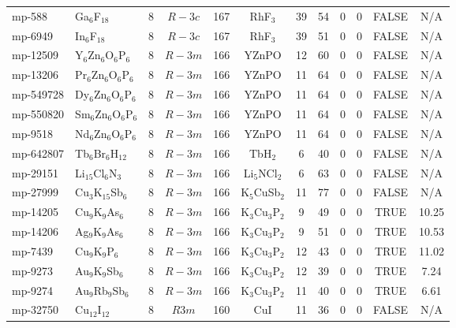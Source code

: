 {\begin{longtable}{llcccccccccc}
    mp-588 & Ga$_{6}$F$_{18}$ & 8     & $R-3c$ & 167   & RhF$_{3}$ & 39    & 54    & 0     & 0     & FALSE & N/A \\
    mp-6949 & In$_{6}$F$_{18}$ & 8     & $R-3c$ & 167   & RhF$_{3}$ & 39    & 51    & 0     & 0     & FALSE & N/A \\
    mp-12509 & Y$_{6}$Zn$_{6}$O$_{6}$P$_{6}$ & 8     & $R-3m$ & 166   & YZnPO & 12    & 60    & 0     & 0     & FALSE & N/A \\
    mp-13206 & Pr$_{6}$Zn$_{6}$O$_{6}$P$_{6}$ & 8     & $R-3m$ & 166   & YZnPO & 11    & 64    & 0     & 0     & FALSE & N/A \\
    mp-549728 & Dy$_{6}$Zn$_{6}$O$_{6}$P$_{6}$ & 8     & $R-3m$ & 166   & YZnPO & 11    & 64    & 0     & 0     & FALSE & N/A \\
    mp-550820 & Sm$_{6}$Zn$_{6}$O$_{6}$P$_{6}$ & 8     & $R-3m$ & 166   & YZnPO & 11    & 64    & 0     & 0     & FALSE & N/A \\
    mp-9518 & Nd$_{6}$Zn$_{6}$O$_{6}$P$_{6}$ & 8     & $R-3m$ & 166   & YZnPO & 11    & 64    & 0     & 0     & FALSE & N/A \\
    mp-642807 & Tb$_{6}$Br$_{6}$H$_{12}$ & 8     & $R-3m$ & 166   & TbH$_{2}$ & 6     & 40    & 0     & 0     & FALSE & N/A \\
    mp-29151 & Li$_{15}$Cl$_{6}$N$_{3}$ & 8     & $R-3m$ & 166   & Li$_{5}$NCl$_{2}$ & 6     & 63    & 0     & 0     & FALSE & N/A \\
    mp-27999 & Cu$_{3}$K$_{15}$Sb$_{6}$ & 8     & $R-3m$ & 166   & K$_{5}$CuSb$_{2}$ & 11    & 77    & 0     & 0     & FALSE & N/A \\
    mp-14205 & Cu$_{9}$K$_{9}$As$_{6}$ & 8     & $R-3m$ & 166   & K$_{3}$Cu$_{3}$P$_{2}$ & 9     & 49    & 0     & 0     & TRUE  & 10.25  \\
    mp-14206 & Ag$_{9}$K$_{9}$As$_{6}$ & 8     & $R-3m$ & 166   & K$_{3}$Cu$_{3}$P$_{2}$ & 9     & 51    & 0     & 0     & TRUE  & 10.53  \\
    mp-7439 & Cu$_{9}$K$_{9}$P$_{6}$ & 8     & $R-3m$ & 166   & K$_{3}$Cu$_{3}$P$_{2}$ & 12    & 43    & 0     & 0     & TRUE  & 11.02  \\
    mp-9273 & Au$_{9}$K$_{9}$Sb$_{6}$ & 8     & $R-3m$ & 166   & K$_{3}$Cu$_{3}$P$_{2}$ & 12    & 39    & 0     & 0     & TRUE  & 7.24  \\
    mp-9274 & Au$_{9}$Rb$_{9}$Sb$_{6}$ & 8     & $R-3m$ & 166   & K$_{3}$Cu$_{3}$P$_{2}$ & 11    & 40    & 0     & 0     & TRUE  & 6.61  \\
    mp-32750 & Cu$_{12}$I$_{12}$ & 8     & $R3m$ & 160   & CuI   & 11    & 36    & 0     & 0     & FALSE & N/A \\

\end{longtable}}
